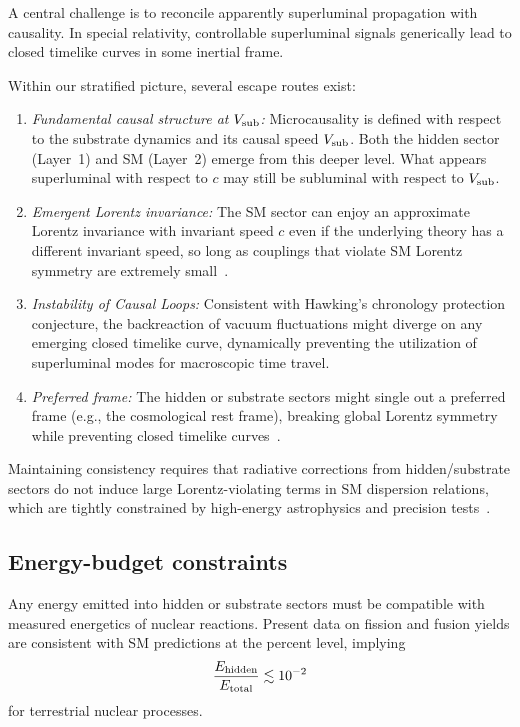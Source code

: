 \documentclass[aps,prd,twocolumn,nofootinbib,superscriptaddress]{revtex4-2}
\begin{document}
A central challenge is to reconcile apparently superluminal propagation with causality. In special relativity, controllable superluminal signals generically lead to closed timelike curves in some inertial frame.

Within our stratified picture, several escape routes exist:
\begin{enumerate}
    \item \textit{Fundamental causal structure at $V_{\rm sub}$:} Microcausality is defined with respect to the substrate dynamics and its causal speed $V_{\rm sub}$. Both the hidden sector (Layer~1) and SM (Layer~2) emerge from this deeper level. What appears superluminal with respect to $c$ may still be subluminal with respect to $V_{\rm sub}$.
    \item \textit{Emergent Lorentz invariance:} The SM sector can enjoy an approximate Lorentz invariance with invariant speed $c$ even if the underlying theory has a different invariant speed, so long as couplings that violate SM Lorentz symmetry are extremely small~\cite{LiberatiReview}.
    \item \textit{Instability of Causal Loops:} Consistent with Hawking's chronology protection conjecture, the backreaction of vacuum fluctuations might diverge on any emerging closed timelike curve, dynamically preventing the utilization of superluminal modes for macroscopic time travel.
    \item \textit{Preferred frame:} The hidden or substrate sectors might single out a preferred frame (e.g., the cosmological rest frame), breaking global Lorentz symmetry while preventing closed timelike curves~\cite{Hawking1992}.
\end{enumerate}

Maintaining consistency requires that radiative corrections from hidden/substrate sectors do not induce large Lorentz-violating terms in SM dispersion relations, which are tightly constrained by high-energy astrophysics and precision tests~\cite{LiberatiReview}.

\subsection{Energy-budget constraints}

Any energy emitted into hidden or substrate sectors must be compatible with measured energetics of nuclear reactions. Present data on fission and fusion yields are consistent with SM predictions at the percent level, implying
\begin{equation}
    \frac{E_{\rm hidden}}{E_{\rm total}} \lesssim 10^{-2}
\end{equation}
for terrestrial nuclear processes.
\end{document}
